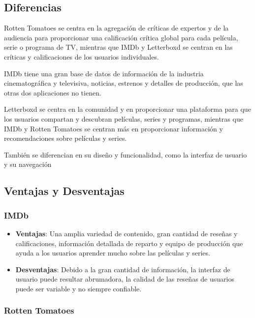 \subsection{Diferencias}

Rotten Tomatoes se centra en la agregación de críticas de expertos y de la audiencia para proporcionar 
una calificación crítica global para cada película, serie o programa de TV, mientras que IMDb y 
Letterboxd se centran en las críticas y calificaciones de los usuarios individuales.

IMDb tiene una gran base de datos de información de la industria cinematográfica y televisiva, 
noticias, estrenos y detalles de producción, que las otras dos aplicaciones no tienen.

Letterboxd se centra en la comunidad y en proporcionar una plataforma para que los usuarios compartan 
y descubran películas, series y programas, mientras que IMDb y Rotten Tomatoes se centran más en 
proporcionar información y recomendaciones sobre películas y series.

También se diferencian en su diseño y funcionalidad, como la interfaz de usuario y su navegación

\subsection{Ventajas y Desventajas}

\subsubsection{IMDb}

\begin{itemize}
    \item \textbf{Ventajas}: Una amplia variedad de contenido, gran cantidad de reseñas y 
    calificaciones, información detallada de reparto y equipo de producción que ayuda a los usuarios 
    aprender mucho sobre las películas y series.
    \item \textbf{Desventajas}: Debido a la gran cantidad de información, la interfaz de usuario puede 
    resultar abrumadora, la calidad de las reseñas de usuarios puede ser variable y no siempre 
    confiable.
\end{itemize}

\subsubsection{Rotten Tomatoes}

